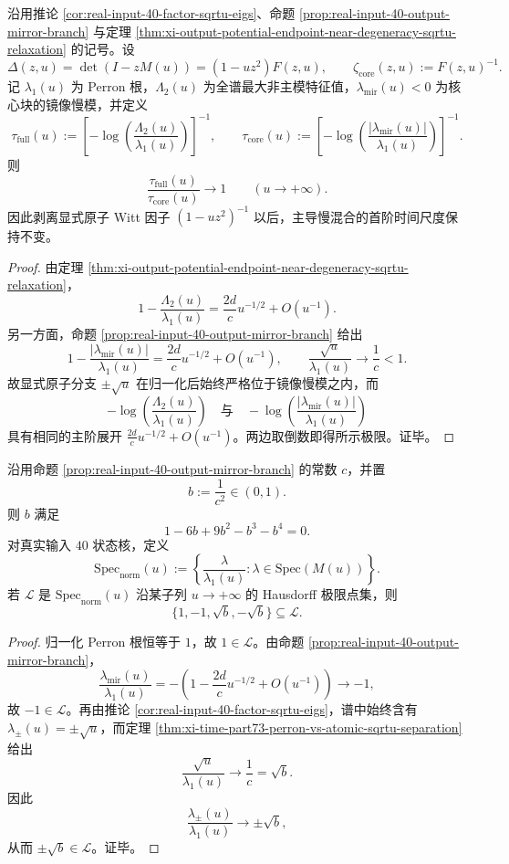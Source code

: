 \begin{theorem}\label{thm:xi-time-part9w-atomic-witt-surgery-slowmixing-invariance}
沿用推论 \ref{cor:real-input-40-factor-sqrtu-eigs}、命题 \ref{prop:real-input-40-output-mirror-branch} 与定理 \ref{thm:xi-output-potential-endpoint-near-degeneracy-sqrtu-relaxation} 的记号。设
\[
\Delta(z,u)=\det(I-zM(u))=(1-uz^2)F(z,u),
\qquad
\zeta_{\mathrm{core}}(z,u):=F(z,u)^{-1}.
\]
记 \(\lambda_1(u)\) 为 Perron 根，\(\Lambda_2(u)\) 为全谱最大非主模特征值，\(\lambda_{\mathrm{mir}}(u)<0\) 为核心块的镜像慢模，并定义
\[
\tau_{\mathrm{full}}(u):=\left[-\log\!\left(\frac{\Lambda_2(u)}{\lambda_1(u)}\right)\right]^{-1},
\qquad
\tau_{\mathrm{core}}(u):=\left[-\log\!\left(\frac{|\lambda_{\mathrm{mir}}(u)|}{\lambda_1(u)}\right)\right]^{-1}.
\]
则
\[
\frac{\tau_{\mathrm{full}}(u)}{\tau_{\mathrm{core}}(u)}\longrightarrow 1
\qquad (u\to+\infty).
\]
因此剥离显式原子 Witt 因子 \((1-uz^2)^{-1}\) 以后，主导慢混合的首阶时间尺度保持不变。
\end{theorem}
\begin{proof}
由定理 \ref{thm:xi-output-potential-endpoint-near-degeneracy-sqrtu-relaxation}，
\[
1-\frac{\Lambda_2(u)}{\lambda_1(u)}=\frac{2d}{c}u^{-1/2}+O(u^{-1}).
\]
另一方面，命题 \ref{prop:real-input-40-output-mirror-branch} 给出
\[
1-\frac{|\lambda_{\mathrm{mir}}(u)|}{\lambda_1(u)}=\frac{2d}{c}u^{-1/2}+O(u^{-1}),
\qquad
\frac{\sqrt u}{\lambda_1(u)}\longrightarrow \frac1c<1.
\]
故显式原子分支 \(\pm\sqrt u\) 在归一化后始终严格位于镜像慢模之内，而
\[
-\log\!\left(\frac{\Lambda_2(u)}{\lambda_1(u)}\right)
\quad\text{与}\quad
-\log\!\left(\frac{|\lambda_{\mathrm{mir}}(u)|}{\lambda_1(u)}\right)
\]
具有相同的主阶展开 \(\frac{2d}{c}u^{-1/2}+O(u^{-1})\)。两边取倒数即得所示极限。证毕。
\end{proof}

\begin{theorem}[零温归一化谱的四点骨架]\label{thm:xi-time-part9w-zero-temp-normalized-spectrum-fourpoint-skeleton}
沿用命题 \ref{prop:real-input-40-output-mirror-branch} 的常数 \(c\)，并置
\[
b:=\frac1{c^2}\in(0,1).
\]
则 \(b\) 满足
\[
1-6b+9b^2-b^3-b^4=0.
\]
对真实输入 \(40\) 状态核，定义
\[
\mathrm{Spec}_{\mathrm{norm}}(u):=\left\{\frac{\lambda}{\lambda_1(u)}:\lambda\in\mathrm{Spec}(M(u))\right\}.
\]
若 \(\mathcal L\) 是 \(\mathrm{Spec}_{\mathrm{norm}}(u)\) 沿某子列 \(u\to+\infty\) 的 Hausdorff 极限点集，则
\[
\{1,-1,\sqrt b,-\sqrt b\}\subseteq \mathcal L.
\]
\end{theorem}
\begin{proof}
归一化 Perron 根恒等于 \(1\)，故 \(1\in\mathcal L\)。由命题 \ref{prop:real-input-40-output-mirror-branch}，
\[
\frac{\lambda_{\mathrm{mir}}(u)}{\lambda_1(u)}
=
-\left(1-\frac{2d}{c}u^{-1/2}+O(u^{-1})\right)
\longrightarrow -1,
\]
故 \(-1\in\mathcal L\)。再由推论 \ref{cor:real-input-40-factor-sqrtu-eigs}，谱中始终含有 \(\lambda_\pm(u)=\pm\sqrt u\)，而定理 \ref{thm:xi-time-part73-perron-vs-atomic-sqrtu-separation} 给出
\[
\frac{\sqrt u}{\lambda_1(u)}\longrightarrow \frac1c=\sqrt b.
\]
因此
\[
\frac{\lambda_\pm(u)}{\lambda_1(u)}\longrightarrow \pm\sqrt b,
\]
从而 \(\pm\sqrt b\in\mathcal L\)。证毕。
\end{proof}


